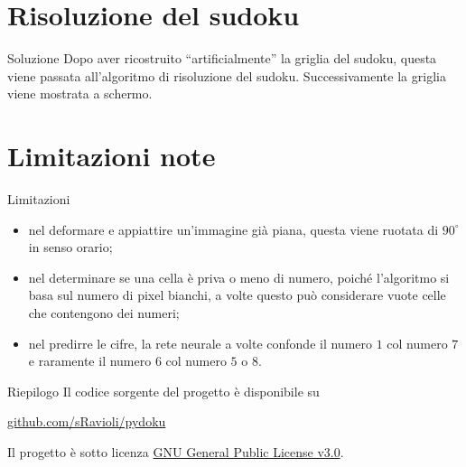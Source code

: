 \documentclass[10pt]{beamer}
\begin{document}
\section{Risoluzione del sudoku}

\begin{frame}[fragile]{Soluzione}
    Dopo aver ricostruito ``artificialmente'' la griglia del sudoku, questa
    viene passata all'algoritmo di risoluzione del sudoku.
    Successivamente la griglia viene mostrata a schermo.
\end{frame}

\section{Limitazioni note}

\begin{frame}[fragile]{Limitazioni}
    \begin{itemize}
        \item nel deformare e appiattire un'immagine già piana, questa viene
            ruotata di \(90^\circ\) in senso orario;
        \item nel determinare se una cella è priva o meno di numero, poiché
            l'algoritmo si basa sul numero di pixel bianchi, a volte
            questo può considerare vuote celle che contengono dei numeri;
        \item nel predirre le cifre, la rete neurale a volte confonde il numero
            \(1\) col numero \(7\) e raramente il numero \(6\) col numero \(5\)
            o \(8\).
    \end{itemize}
\end{frame}

\begin{frame}{Riepilogo}
    Il codice sorgente del progetto è disponibile su

    \begin{center}
        \href{https://www.github.com/sRavioli/pydoku}{github.com/sRavioli/pydoku}
    \end{center}

    Il progetto è sotto licenza \href{https://www.gnu.org/licenses/gpl-3.0.html}{GNU General Public License v3.0}.
\end{frame}
\end{document}
